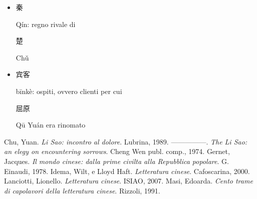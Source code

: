 \documentclass[12pt,titlepage]{article}
\begin{document}
\begin{itemize}
\item \begin{CJK*}{UTF8}{gbsn}秦 \end{CJK*} Qín: regno rivale di\begin{CJK*}{UTF8}{gbsn} 楚 \end{CJK*} Chǔ
\item \begin{CJK*}{UTF8}{gbsn}宾客 \end{CJK*} bīnkè: ospiti, ovvero clienti per cui \begin{CJK*}{UTF8}{gbsn}屈原\end{CJK*} Qū Yuán era rinomato
\end{itemize}

\newpage
\renewcommand\refname{Bibliografia}
\begin{thebibliography}{9}
 Chu, Yuan. \emph{Li Sao: incontro al dolore}. Lubrina, 1989.
—————. \emph{The Li Sao: an elegy on encountering sorrows}. Cheng Wen publ. comp., 1974.
Gernet, Jacques. \emph{Il mondo cinese: dalla prime civilta alla Repubblica popolare}. G. Einaudi, 1978.
Idema, Wilt, e Lloyd Haft. \emph{Letteratura cinese}. Cafoscarina, 2000.
Lanciotti, Lionello. \emph{Letteratura cinese}. ISIAO, 2007.
Masi, Edoarda. \emph{Cento trame di capolavori della letteratura cinese}. Rizzoli, 1991.
\end{thebibliography}
\end{document}
